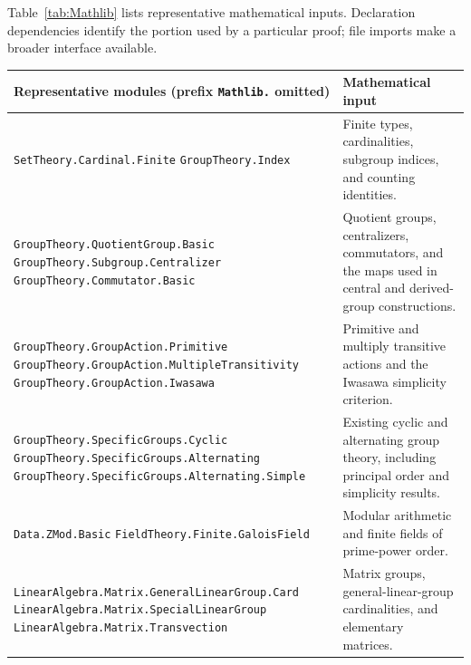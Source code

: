 \documentclass[11pt]{article}
\numberwithin{equation}{section}
\theoremstyle{definition}
\newcommand{\code}[1]{\texttt{\small #1}}
\newcommand{\leanname}[1]{{\small\nolinkurl{#1}}}
\begin{document}
Table~\ref{tab:Mathlib} lists representative mathematical inputs.
Declaration dependencies identify the portion used by a particular
proof; file imports make a broader interface available.

\begin{table}[!htbp]
\centering\small
\begin{tabularx}{\textwidth}{@{}>{\raggedright\arraybackslash}p{} X@{}}
\toprule
Representative modules (prefix \code{Mathlib.} omitted) & Mathematical input\\
\midrule
\leanname{Data.Fintype.Card}\newline
\leanname{SetTheory.Cardinal.Finite}\newline
\leanname{GroupTheory.Index}
& Finite types, cardinalities, subgroup indices, and counting identities.\\
\addlinespace
\leanname{GroupTheory.QuotientGroup.Basic}\newline
\leanname{GroupTheory.Subgroup.Centralizer}\newline
\leanname{GroupTheory.Commutator.Basic}
& Quotient groups, centralizers, commutators, and the maps used in central and derived-group constructions.\\
\addlinespace
\leanname{GroupTheory.GroupAction.Primitive}\newline
\leanname{GroupTheory.GroupAction.MultipleTransitivity}\newline
\leanname{GroupTheory.GroupAction.Iwasawa}
& Primitive and multiply transitive actions and the Iwasawa simplicity criterion.\\
\addlinespace
\leanname{GroupTheory.SpecificGroups.Cyclic}\newline
\leanname{GroupTheory.SpecificGroups.Alternating}\newline
\leanname{GroupTheory.SpecificGroups.Alternating.Simple}
& Existing cyclic and alternating group theory, including principal order and simplicity results.\\
\addlinespace
\leanname{Data.ZMod.Basic}\newline
\leanname{FieldTheory.Finite.GaloisField}
& Modular arithmetic and finite fields of prime-power order.\\
\addlinespace
\leanname{LinearAlgebra.Matrix.GeneralLinearGroup.Card}\newline
\leanname{LinearAlgebra.Matrix.SpecialLinearGroup}\newline
\leanname{LinearAlgebra.Matrix.Transvection}
& Matrix groups, general-linear-group cardinalities, and elementary matrices.\\

\end{tabularx}
\end{table}
\end{document}
